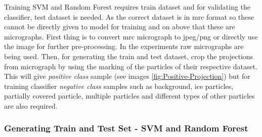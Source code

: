 \documentclass[twoside]{iitbreport}
\begin{document}
Training SVM and Random Forest requires train dataset and for validating the classifier, test dataset is needed. As the correct dataset is in mrc format so these cannot be directly given to model for training and on above that these are micrographs. First thing is to convert mrc micrograph to jpeg/png or directly use the image for further pre-processing. In the experiments raw micrographs are being used. Then, for generating the train and test dataset, crop the projections from micrograph by using the marking of the particles of their respective dataset. This will give \textit{positive class} sample (see images \ref{fig:Positive-Projection}) but for training classifier \textit{negative class} samples such as background, ice particles, partially covered particle, multiple particles and different types of other particles are also required. \\
\subsubsection{Generating Train and Test Set - SVM and Random Forest}
\end{document}
